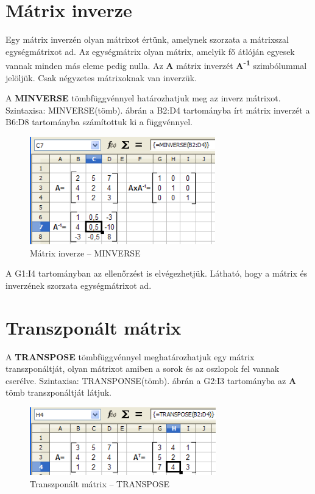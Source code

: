 \section{Mátrix inverze}

Egy mátrix inverzén olyan mátrixot értünk, amelynek szorzata a
mátrixszal egységmátrixot ad. Az egységmátrix olyan mátrix,
amelyik fő átlóján egyesek vannak minden más eleme pedig
nulla. Az \textbf{A} mátrix inverzét \textbf{A\textsuperscript{{}-1}}
szimbólummal jelöljük. Csak négyzetes mátrixoknak van inverzük.

A \textbf{MINVERSE} tömbfüggvénnyel határozhatjuk meg az inverz
mátrixot. Szintaxisa: MINVERSE(tömb).  ábrán a B2:D4
tartományba írt mátrix inverzét a B6:D8 tartományba
számítottuk ki a függvénnyel.

\begin{figure}[!h]
\begin{center}
\includegraphics[width=8.047cm]{oocalcv1-img136.png}
\caption{Mátrix inverze --  MINVERSE}\label{MátrixInverse}
\end{center}
\end{figure}

A G1:I4 tartományban az ellenőrzést is elvégezhetjük.
Látható, hogy a mátrix és inverzének szorzata
egységmátrixot ad.


\section{Transzponált mátrix}
A \textbf{TRANSPOSE} tömbfüggvénnyel meghatározhatjuk egy
mátrix transzponáltját, olyan mátrixot amiben a sorok és az
oszlopok fel vannak cserélve. Szintaxisa: TRANSPONSE(tömb). 
 ábrán a G2:I3 tartományba az
\textbf{A} tömb transzponáltját látjuk. 

\begin{figure}[!h]
\begin{center}
\includegraphics[width=8.073cm]{oocalcv1-img137.png}
\caption{Transzponált mátrix --  TRANSPOSE}\label{TranszponáltMátrix}
\end{center}
\end{figure}

